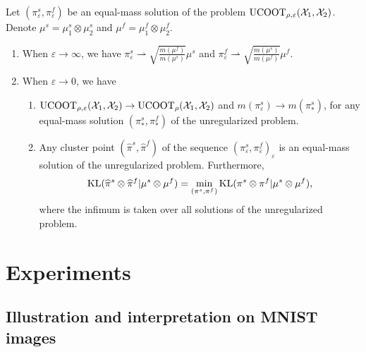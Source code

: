\begin{proposition}
  \label{prop:convergence_minimiser_unbalanced}
  Let $(\pi_{\varepsilon}^s, \pi_{\varepsilon}^f)$ be an equal-mass solution of the problem
  $\text{UCOOT}_{\rho, \varepsilon}(\mathcal X_1, \mathcal X_2)$. Denote $\mu^s = \mu_1^s \otimes \mu_2^s$
  and $\mu^f = \mu_1^f \otimes \mu_2^f$.
  \begin{enumerate}
    \item When $\varepsilon \to \infty$, we have $\pi_{\varepsilon}^s \rightharpoonup
    \sqrt{\frac{m(\mu^f)}{m(\mu^s)}} \mu^s$
    and $\pi_{\varepsilon}^f \rightharpoonup \sqrt{\frac{m(\mu^s)}{m(\mu^f)}} \mu^f$.

    \item When $\varepsilon \to 0$, we have
    \begin{enumerate}
      \item $\text{UCOOT}_{\rho, \varepsilon}(\mathcal X_1, \mathcal X_2) \to \text{UCOOT}_{\rho}(\mathcal X_1, \mathcal X_2)$ and
      $m(\pi_{\varepsilon}^s) \to m(\pi_*^s)$, for any equal-mass solution
      $(\pi_*^s, \pi_*^f)$ of the unregularized problem.

      \item Any cluster point $(\widehat{\pi}^s, \widehat{\pi}^f)$ of the sequence
      $(\pi_{\varepsilon}^s, \pi_{\varepsilon}^f)_{\varepsilon}$ is an equal-mass
      solution of the unregularized problem. Furthermore,
      \begin{equation}
        \text{KL}(\widehat{\pi}^s \otimes \widehat{\pi}^f | \mu^s \otimes \mu^f) =
        \min_{(\pi^s, \pi^f)} \text{KL}(\pi^s \otimes \pi^f \vert \mu^s \otimes \mu^f),
      \end{equation}
      where the infimum is taken over all solutions of the unregularized problem.
    \end{enumerate}
  \end{enumerate}
\end{proposition}

\section{Experiments} \label{sec:experiments}
\subsection{Illustration and interpretation on MNIST images}

